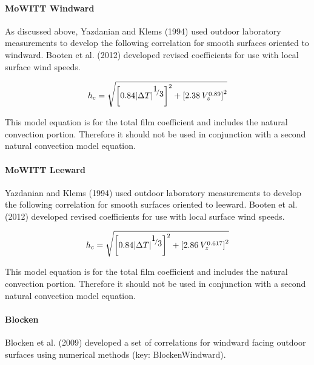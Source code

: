 \paragraph{MoWITT Windward}\label{mowitt-windward}

As discussed above, Yazdanian and Klems (1994) used outdoor laboratory measurements to develop the following correlation for smooth surfaces oriented to windward. Booten et al. (2012) developed revised coefficients for use with local surface wind speeds.

\begin{equation}
{h_c} = \sqrt {{{\left[ {0.84{{\left| {\Delta T} \right|}^{{\raise0.7ex\hbox{1} \!\mathord{\left/ {\vphantom {1 3}}\right.}\!\lower0.7ex\hbox{3}}}}} \right]}^2} + {{\left[ {2.38{\kern 1pt} {\kern 1pt} V_z^{0.89}} \right]}^2}}
\end{equation}

This model equation is for the total film coefficient and includes the natural convection portion. Therefore it should not be used in conjunction with a second natural convection model equation.

\paragraph{MoWITT Leeward}\label{mowitt-leeward}

Yazdanian and Klems (1994) used outdoor laboratory measurements to develop the following correlation for smooth surfaces oriented to leeward. Booten et al. (2012) developed revised coefficients for use with local surface wind speeds.

\begin{equation}
{h_c} = \sqrt {{{\left[ {0.84{{\left| {\Delta T} \right|}^{{\raise0.7ex\hbox{1} \!\mathord{\left/ {\vphantom {1 3}}\right.}\!\lower0.7ex\hbox{3}}}}} \right]}^2} + {{\left[ {2.86{\kern 1pt} {\kern 1pt} V_z^{0.617}} \right]}^2}}
\end{equation}

This model equation is for the total film coefficient and includes the natural convection portion. Therefore it should not be used in conjunction with a second natural convection model equation.

\paragraph{Blocken}\label{blocken}

Blocken et al. (2009) developed a set of correlations for windward facing outdoor surfaces using numerical methods (key: BlockenWindward).


